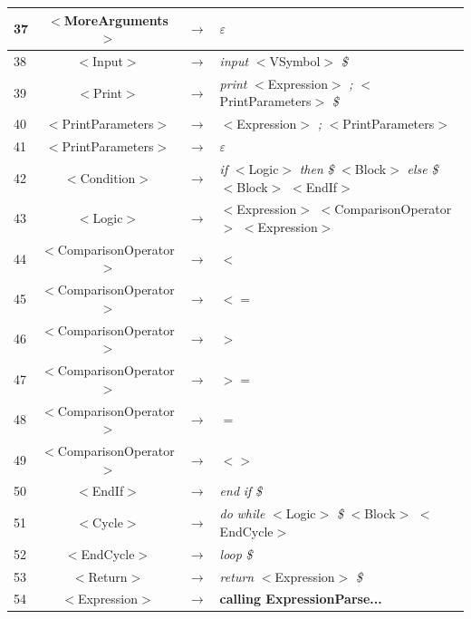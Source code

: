 \documentclass[10pt,a4paper,titlepage]{article}
\begin{document}
{\begin{center}
\begin{tabular}{ | l | c  c  l | }
      37 & $<$MoreArguments$>$            & $\rightarrow$ & $\varepsilon$ \\ \hline
      38 & $<$Input$>$                    & $\rightarrow$ & {\it input} $<$VSymbol$>$ {\it \$} \\ \hline
      39 & $<$Print$>$                    & $\rightarrow$ & {\it print} $<$Expression$>$ {\it ;} $<$PrintParameters$>$ {\it \$} \\ \hline
      40 & $<$PrintParameters$>$          & $\rightarrow$ & $<$Expression$>$ {\it ;} $<$PrintParameters$>$ \\ \hline
      41 & $<$PrintParameters$>$          & $\rightarrow$ & $\varepsilon$ \\ \hline
      42 & $<$Condition$>$                & $\rightarrow$ & {\it if} $<$Logic$>$ {\it then} {\it \$} $<$Block$>$ {\it else} {\it \$} $<$Block$>$ $<$EndIf$>$ \\ \hline
      43 & $<$Logic$>$                    & $\rightarrow$ & $<$Expression$>$ $<$ComparisonOperator$>$ $<$Expression$>$ \\ \hline
      44 & $<$ComparisonOperator$>$       & $\rightarrow$ & {\it $<$} \\ \hline
      45 & $<$ComparisonOperator$>$       & $\rightarrow$ & {\it $<=$} \\ \hline
      46 & $<$ComparisonOperator$>$       & $\rightarrow$ & {\it $>$} \\ \hline
      47 & $<$ComparisonOperator$>$       & $\rightarrow$ & {\it $>=$} \\ \hline
      48 & $<$ComparisonOperator$>$       & $\rightarrow$ & {\it $=$} \\ \hline
      49 & $<$ComparisonOperator$>$       & $\rightarrow$ & {\it $<>$} \\ \hline
      50 & $<$EndIf$>$                    & $\rightarrow$ & {\it end} {\it if} {\it \$} \\ \hline
      51 & $<$Cycle$>$                    & $\rightarrow$ & {\it do} {\it while} $<$Logic$>$ {\it \$} $<$Block$>$ $<$EndCycle$>$ \\ \hline
      52 & $<$EndCycle$>$                 & $\rightarrow$ & {\it loop} {\it \$} \\ \hline
      53 & $<$Return$>$                   & $\rightarrow$ & {\it return} $<$Expression$>$ {\it \$} \\ \hline
      54 & $<$Expression$>$               & $\rightarrow$ & {\bf calling ExpressionParse...} \\ \hline
    \end{tabular}
  \end{center}
}
\end{document}

